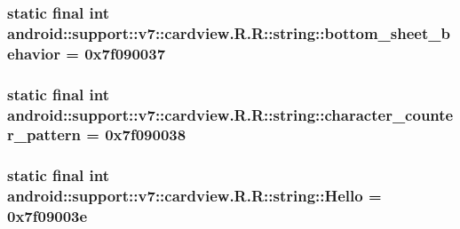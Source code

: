 \hypertarget{classandroid_1_1support_1_1v7_1_1cardview_1_1_r_1_1string_be6070dac450330f187f43a678fe7509}{
\subsubsection[{bottom\_\-sheet\_\-behavior}]{\setlength{\rightskip}{0pt plus 5cm}static final int android::support::v7::cardview.R.R::string::bottom\_\-sheet\_\-behavior = 0x7f090037}}
\label{classandroid_1_1support_1_1v7_1_1cardview_1_1_r_1_1string_be6070dac450330f187f43a678fe7509}


\hypertarget{classandroid_1_1support_1_1v7_1_1cardview_1_1_r_1_1string_f655076fa307c240eeddc974fa6492e9}{
\subsubsection[{character\_\-counter\_\-pattern}]{\setlength{\rightskip}{0pt plus 5cm}static final int android::support::v7::cardview.R.R::string::character\_\-counter\_\-pattern = 0x7f090038}}
\label{classandroid_1_1support_1_1v7_1_1cardview_1_1_r_1_1string_f655076fa307c240eeddc974fa6492e9}


\hypertarget{classandroid_1_1support_1_1v7_1_1cardview_1_1_r_1_1string_4e61494828d82f93571e9ed8638ea32b}{
\subsubsection[{Hello}]{\setlength{\rightskip}{0pt plus 5cm}static final int android::support::v7::cardview.R.R::string::Hello = 0x7f09003e}}
\label{classandroid_1_1support_1_1v7_1_1cardview_1_1_r_1_1string_4e61494828d82f93571e9ed8638ea32b}


